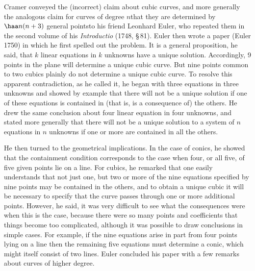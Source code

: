 Cramer conveyed the (incorrect) claim about cubic curves, and more
generally the analogous claim for curves of degree $n$\emdash  that
they are determined by $\haa n(n+3)$ general points\emdash  to his
friend Leonhard Euler, who repeated  them in the second volume of his
\emph{Introductio} (1748, \S\,81). Euler then wrote a paper (Euler
1750) in which he first spelled out the problem. It is a general
proposition, he said, that $k$ linear equations in $k$ unknowns have
a unique solution. Accordingly, 9 points in the plane will determine a
unique cubic curve. But nine points common to two cubics plainly do not
determine a unique cubic curve. To resolve this apparent contradiction,
as he called it, he began with  three equations in three unknowns and
showed by example that there will not be a unique solution if one of these
equations is contained in (that is, is a consequence of) the others. He
drew the same conclusion about four linear equation in four unknowns,
and stated more generally that there will not be a unique solution to
a system of $n$ equations in $n$ unknowns if one or more are contained
in all the others.

He then turned to the geometrical implications. In the case of conics,
he showed that the containment condition corresponds to the case when
four, or all five, of five given points lie on a line.  For cubics,
he remarked that one easily understands that not just one, but two or
more of the nine equations specified by nine points may be contained in
the others, and to obtain a unique cubic it will be necessary to specify
that the curve passes through one or more additional points.  However,
he said, it was very difficult to see what the consequences were when
this is the case, because there were so many points and coefficients
that things become too complicated, although it was possible to draw
conclusions in simple cases. For example, if the nine equations arise in
part from four points lying on a line then the remaining five equations
must determine a conic, which might itself consist of two lines. Euler
concluded his paper with a few remarks about curves of higher degree.


